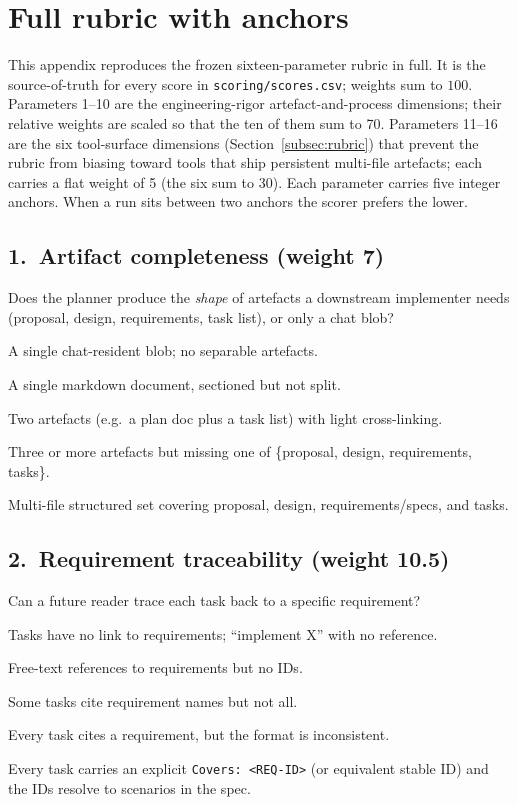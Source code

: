 \section{Full rubric with anchors}
\label{app:rubric}

This appendix reproduces the frozen sixteen-parameter rubric in full. It is
the source-of-truth for every score in \texttt{scoring/scores.csv};
weights sum to $100$. Parameters 1--10 are the engineering-rigor
artefact-and-process dimensions; their relative weights are scaled so
that the ten of them sum to 70. Parameters 11--16 are the six
tool-surface dimensions (Section~\ref{subsec:rubric}) that prevent
the rubric from biasing toward tools that ship persistent multi-file
artefacts; each carries a flat weight of 5 (the six sum to 30). Each
parameter carries five integer anchors. When a run sits between two
anchors the scorer prefers the lower.

\subsection*{1.\ Artifact completeness (weight 7)}
Does the planner produce the \emph{shape} of artefacts a downstream
implementer needs (proposal, design, requirements, task list), or only
a chat blob?
\begin{description}[leftmargin=11mm, labelindent=0mm]
\item[1] A single chat-resident blob; no separable artefacts.
\item[2] A single markdown document, sectioned but not split.
\item[3] Two artefacts (e.g.\ a plan doc plus a task list) with light cross-linking.
\item[4] Three or more artefacts but missing one of \{proposal, design, requirements, tasks\}.
\item[5] Multi-file structured set covering proposal, design, requirements/specs, and tasks.
\end{description}

\subsection*{2.\ Requirement traceability (weight 10.5)}
Can a future reader trace each task back to a specific requirement?
\begin{description}[leftmargin=11mm, labelindent=0mm]
\item[1] Tasks have no link to requirements; ``implement X'' with no reference.
\item[2] Free-text references to requirements but no IDs.
\item[3] Some tasks cite requirement names but not all.
\item[4] Every task cites a requirement, but the format is inconsistent.
\item[5] Every task carries an explicit \texttt{Covers: <REQ-ID>} (or equivalent stable ID) and the IDs resolve to scenarios in the spec.
\end{description}

